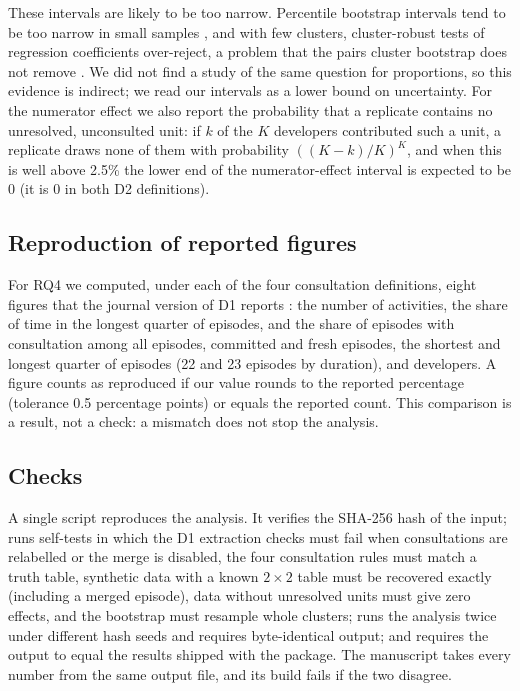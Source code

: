 \documentclass[pdflatex,sn-basic]{sn-jnl}
\begin{document}
These intervals are likely to be too narrow. Percentile bootstrap intervals tend to be too narrow in small samples \citep{hesterberg2015}, and with few clusters, cluster-robust tests of regression coefficients over-reject, a problem that the pairs cluster bootstrap does not remove \citep{cameron2008,cameron2015}. We did not find a study of the same question for proportions, so this evidence is indirect; we read our intervals as a lower bound on uncertainty. For the numerator effect we also report the probability that a replicate contains no unresolved, unconsulted unit: if $k$ of the $K$ developers contributed such a unit, a replicate draws none of them with probability $((K-k)/K)^K$, and when this is well above 2.5\% the lower end of the numerator-effect interval is expected to be 0 (it is 0 in both D2 definitions).

\subsection{Reproduction of reported figures}

For RQ4 we computed, under each of the four consultation definitions, eight figures that the journal version of D1 reports \citep{alaboudi2023}: the number of activities, the share of time in the longest quarter of episodes, and the share of episodes with consultation among all episodes, committed and fresh episodes, the shortest and longest quarter of episodes (22 and 23 episodes by duration), and developers. A figure counts as reproduced if our value rounds to the reported percentage (tolerance 0.5 percentage points) or equals the reported count. This comparison is a result, not a check: a mismatch does not stop the analysis.

\subsection{Checks}\label{sec:checks}

A single script reproduces the analysis. It verifies the SHA-256 hash of the input; runs self-tests in which the D1 extraction checks must fail when consultations are relabelled or the merge is disabled, the four consultation rules must match a truth table, synthetic data with a known $2 \times 2$ table must be recovered exactly (including a merged episode), data without unresolved units must give zero effects, and the bootstrap must resample whole clusters; runs the analysis twice under different hash seeds and requires byte-identical output; and requires the output to equal the results shipped with the package. The manuscript takes every number from the same output file, and its build fails if the two disagree.
\end{document}
